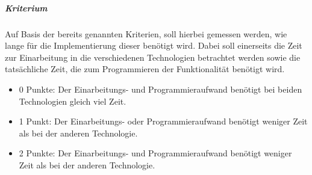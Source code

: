 \subparagraph{Kriterium\\}
Auf Basis der bereits genannten Kriterien, soll hierbei gemessen werden, wie lange für die Implementierung dieser benötigt wird.
Dabei soll einerseits die Zeit zur Einarbeitung in die verschiedenen Technologien betrachtet werden sowie die tatsächliche Zeit, die zum Programmieren der Funktionalität benötigt wird.

\begin{itemize}
\item 0 Punkte: Der Einarbeitungs- und Programmieraufwand benötigt bei beiden Technologien gleich viel Zeit.
\item 1 Punkt: Der Einarbeitungs- oder Programmieraufwand benötigt weniger Zeit als bei der anderen Technologie.
\item 2 Punkte: Der Einarbeitungs- und Programmieraufwand benötigt weniger Zeit als bei der anderen Technologie.
\end{itemize}